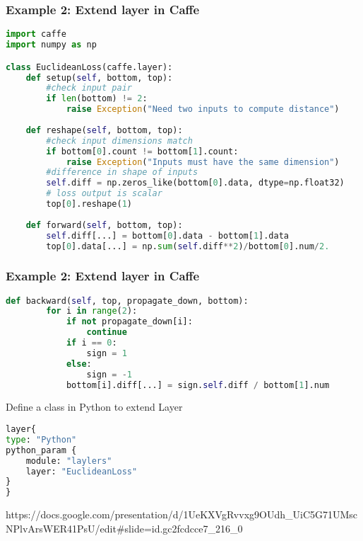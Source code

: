 \begin{frame}[fragile]
  \MyLogo
  \frametitle{Example 2: Extend layer in Caffe}  
\begin{tiny}
\begin{lstlisting}[language=python]
import caffe
import numpy as np 

class EuclideanLoss(caffe.layer):
	def setup(self, bottom, top):
		#check input pair
		if len(bottom) != 2:
			raise Exception("Need two inputs to compute distance")
			
	def reshape(self, bottom, top):
		#check input dimensions match
		if bottom[0].count != bottom[1].count:
			raise Exception("Inputs must have the same dimension")
		#difference in shape of inputs
		self.diff = np.zeros_like(bottom[0].data, dtype=np.float32)
		# loss output is scalar
		top[0].reshape(1)
		
	def forward(self, bottom, top):
		self.diff[...] = bottom[0].data - bottom[1].data
		top[0].data[...] = np.sum(self.diff**2)/bottom[0].num/2.	
\end{lstlisting}
\end{tiny}
\end{frame}

\begin{frame}[fragile]
  \MyLogo
  \frametitle{Example 2: Extend layer in Caffe}  
\ContinueLineNumber
\begin{tiny}
\begin{lstlisting}[language=python]
	def backward(self, top, propagate_down, bottom):
		for i in range(2):
			if not propagate_down[i]:
				continue
			if i == 0:
				sign = 1
			else:
				sign = -1
			bottom[i].diff[...] = sign.self.diff / bottom[1].num
\end{lstlisting}
\end{tiny}


Define a class in Python to extend Layer
\begin{tiny}
\begin{lstlisting}[language=python]
layer{
type: "Python"
python_param {
	module: "laylers"
	layer: "EuclideanLoss"
}
}
\end{lstlisting}
\end{tiny}

\tiny
\begin{center}
{
\color{red}https://docs.google.com/presentation/d/1UeKXVgRvvxg9OUdh\_UiC5G71UMscNPlvArsWER41PsU/edit\#slide=id.gc2fcdcce7\_216\_0
}
\end{center}
\end{frame}